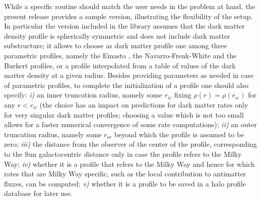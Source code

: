 While a specific  routine should match the user needs in the problem at hand, the present release provides
a sample version, illustrating the flexibility of the setup. In particular the version included in the library  assumes that the dark
matter density profile is spherically symmetric and does not include dark matter substructure; it allows to choose as dark matter 
profile one among three parametric profiles, namely the Einasto \cite{1965TrAlm...5...87E}, the Navarro-Frenk-White \cite{Navarro:1995iw}
and the Burkert \cite{XXX} profiles, or a profile interpolated from a table of values of the dark matter density at a given radius. 
Besides providing parameters as needed in case of parametric profiles, to complete the initialization of a profile one should also specify: 
{\sl i)} an inner truncation radius, namely some $r_{ic}$ fixing $\rho(r)=\rho(r_{ic})$ for any $r<r_{ic}$ (the choice has an impact on predictions
for dark matter rates only for very singular dark matter profiles; choosing a value which is not too small allows for a faster numerical 
convergence of some rate computations); {\sl ii)} an outer truncation radius, namely some $r_{oc}$ beyond which the profile is assumed to 
be zero; {\sl iii)} the distance from the observer of the center of the profile, corresponding to the Sun galactocentric distance only in case 
the profile refers to the Milky Way; {\sl iv)} whether it is a profile that refers to the Milky Way and hence for which rates that are Milky Way 
specific, such as the local contribution to antimatter fluxes, can be computed;  {\sl v)} whether it is a profile to be saved in a halo profile
database for later use. 

